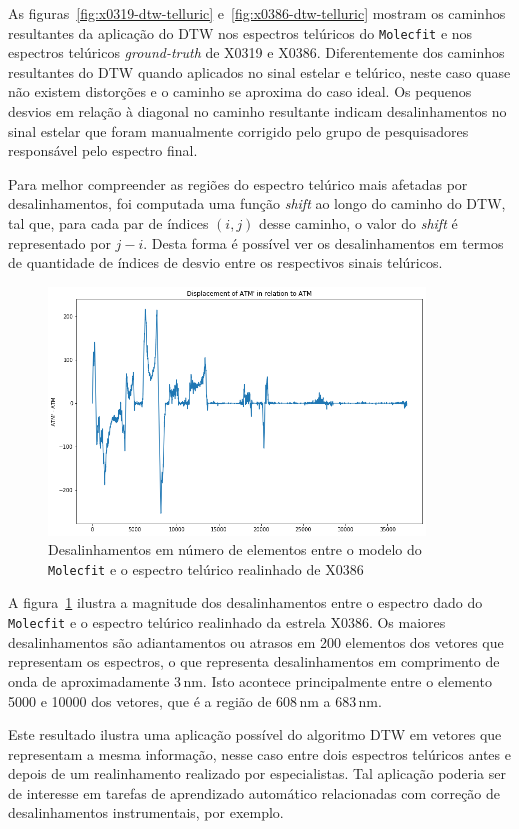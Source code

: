 As figuras~\ref{fig:x0319-dtw-telluric} e~\ref{fig:x0386-dtw-telluric} mostram os caminhos resultantes da aplicação do DTW nos espectros telúricos do \texttt{Molecfit} e nos espectros telúricos \textit{ground-truth} de X0319 e X0386. Diferentemente dos caminhos resultantes do DTW quando aplicados no sinal estelar e telúrico, neste caso quase não existem distorções e o caminho se aproxima do caso ideal. Os pequenos desvios em relação à diagonal no caminho resultante indicam desalinhamentos no sinal estelar que foram manualmente corrigido pelo grupo de pesquisadores responsável pelo espectro final. 

Para melhor compreender as regiões do espectro telúrico mais afetadas por desalinhamentos, foi computada uma função \textit{shift} ao longo do caminho do DTW, tal que, para cada par de índices $(i,j)$ desse caminho, o valor do \textit{shift} é representado por $j - i$. Desta forma é possível ver os desalinhamentos em termos de quantidade de índices de desvio entre os respectivos sinais telúricos.

\begin{figure}[htb]
\centering
\includegraphics[width=10cm]{figuras/x0386_displacement.png}
\caption{Desalinhamentos em número de elementos entre o modelo do \texttt{Molecfit} e o espectro telúrico realinhado de X0386}
\label{fig:x0386-displacement}
\end{figure}

A figura~\ref{fig:x0386-displacement} ilustra a magnitude dos desalinhamentos entre o espectro dado do \texttt{Molecfit} e o espectro telúrico realinhado da estrela X0386. Os maiores desalinhamentos são adiantamentos ou atrasos em 200 elementos dos vetores que representam os espectros, o que representa desalinhamentos em comprimento de onda de aproximadamente 3\,nm. Isto acontece principalmente entre o elemento 5000 e 10000 dos vetores, que é a região de 608\,nm a 683\,nm.

Este resultado ilustra uma aplicação possível do algoritmo DTW em vetores que representam a mesma informação, nesse caso entre dois espectros telúricos antes e depois de um realinhamento realizado por especialistas. Tal aplicação poderia ser de interesse em tarefas de aprendizado automático relacionadas com correção de desalinhamentos instrumentais, por exemplo.

